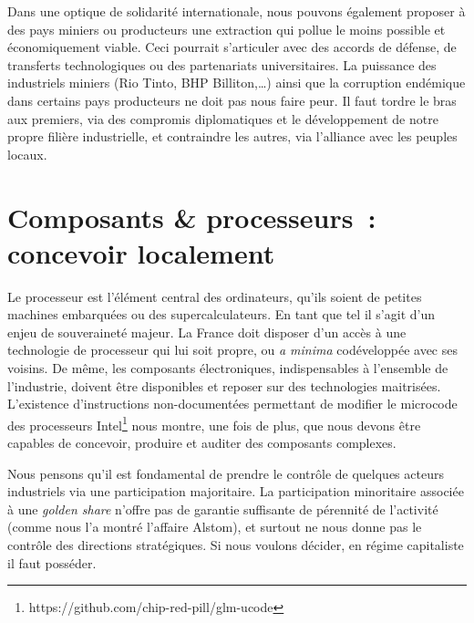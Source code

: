 \documentclass[a4paper]{article}
\begin{document}
Dans une optique de solidarité internationale, nous pouvons également proposer à des pays miniers ou producteurs une extraction qui pollue le moins possible et économiquement viable. Ceci pourrait s’articuler avec des accords de défense, de transferts technologiques ou des partenariats universitaires. La puissance des industriels miniers (Rio Tinto, BHP Billiton,\ldots) ainsi que la corruption endémique dans certains pays producteurs ne doit pas nous faire peur. Il faut tordre le bras aux premiers, via des compromis diplomatiques et le développement de notre propre filière industrielle, et contraindre les autres, via l’alliance avec les peuples locaux. 

\section{Composants \& processeurs~: concevoir localement}
Le processeur est l’élément central des ordinateurs, qu’ils soient de petites machines embarquées ou des supercalculateurs. En tant que tel il s’agit d’un enjeu de souveraineté majeur. La France doit disposer d’un accès à une technologie de processeur qui lui soit propre, ou \textit{a minima} codéveloppée avec ses voisins. De même, les composants électroniques, indispensables à l’ensemble de l’industrie, doivent être disponibles et reposer sur des technologies maitrisées. L’existence d’instructions non-documentées permettant de modifier le microcode des processeurs Intel\footnote{https://github.com/chip-red-pill/glm-ucode} nous montre, une fois de plus, que nous devons être capables de concevoir, produire et auditer des composants complexes. 

Nous pensons qu’il est fondamental de prendre le contrôle de quelques acteurs industriels via une participation majoritaire. La participation minoritaire associée à une \textit{golden share} n’offre pas de garantie suffisante de pérennité de l’activité (comme nous l’a montré l’affaire Alstom), et surtout ne nous donne pas le contrôle des directions stratégiques. Si nous voulons décider, en régime capitaliste il faut posséder. 
\end{document}
